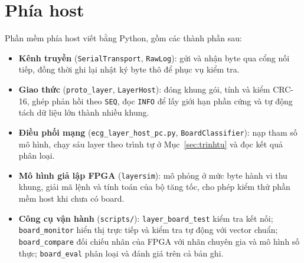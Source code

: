 \section{Phía host}\label{sec:phiahost}
Phần mềm phía host viết bằng Python, gồm các thành phần sau:
\begin{itemize}
  \item \textbf{Kênh truyền} (\texttt{SerialTransport}, \texttt{RawLog}): gửi và nhận byte qua cổng nối tiếp, đồng thời ghi lại nhật ký byte thô để phục vụ kiểm tra.
  \item \textbf{Giao thức} (\texttt{proto\_layer}, \texttt{LayerHost}): đóng khung gói, tính và kiểm CRC-16, ghép phản hồi theo \texttt{SEQ}, đọc \texttt{INFO} để lấy giới hạn phần cứng và tự động tách dữ liệu lớn thành nhiều khung.
  \item \textbf{Điều phối mạng} (\texttt{ecg\_layer\_host\_pc.py}, \texttt{BoardClassifier}): nạp tham số mô hình, chạy sáu layer theo trình tự ở Mục~\ref{sec:trinhtu} và đọc kết quả phân loại.
  \item \textbf{Mô hình giả lập FPGA} (\texttt{layersim}): mô phỏng ở mức byte hành vi thu khung, giải mã lệnh và tính toán của bộ tăng tốc, cho phép kiểm thử phần mềm host khi chưa có board.
  \item \textbf{Công cụ vận hành} (\texttt{scripts/}): \texttt{layer\_board\_test} kiểm tra kết nối; \texttt{board\_monitor} hiển thị trực tiếp và kiểm tra tự động với vector chuẩn; \texttt{board\_compare} đối chiếu nhãn của FPGA với nhãn chuyên gia và mô hình số thực; \texttt{board\_eval} phân loại và đánh giá trên cả bản ghi.
\end{itemize}
